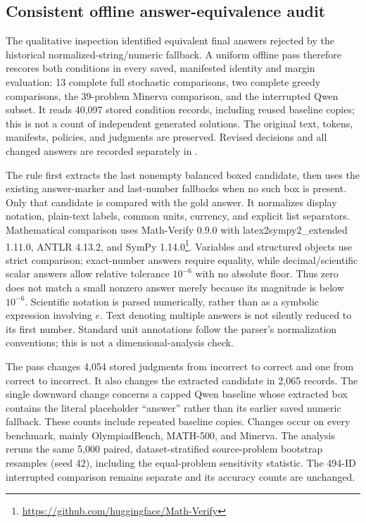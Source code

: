 \subsection{Consistent offline answer-equivalence audit}
\label{sec:guiding-rescoring}

The qualitative inspection identified equivalent final answers rejected by
the historical normalized-string/numeric fallback. A uniform offline pass
therefore rescores both conditions in every saved, manifested identity and
margin evaluation: 13 complete full stochastic comparisons, two complete
greedy comparisons, the 39-problem Minerva comparison, and the interrupted
Qwen subset. It reads 40,097 stored condition records, including reused
baseline copies; this is not a count of independent generated solutions.
The original text, tokens, manifests, policies, and judgments are preserved.
Revised decisions and all changed answers are recorded separately in
.

The rule first extracts the last nonempty balanced boxed candidate, then
uses the existing answer-marker and last-number fallbacks when no such box
is present. Only that candidate is compared with the gold answer. It
normalizes display notation, plain-text labels, common units, currency,
and explicit list separators. Mathematical comparison uses Math-Verify
0.9.0 with latex2sympy2\_extended 1.11.0, ANTLR 4.13.2, and SymPy 1.14.0\footnote{\url{https://github.com/huggingface/Math-Verify}}.
Variables and structured objects use strict comparison; exact-number
answers require equality, while decimal/scientific scalar answers allow
relative tolerance $10^{-6}$ with no absolute floor. Thus zero does not
match a small nonzero answer merely because its magnitude is below
$10^{-6}$. Scientific notation is parsed numerically, rather than as a
symbolic expression involving $e$. Text denoting multiple answers is not
silently reduced to its first number. Standard unit annotations follow the
parser's normalization conventions; this is not a dimensional-analysis check.

The pass changes 4,054 stored judgments from incorrect to correct and one
from correct to incorrect. It also changes the extracted candidate in
2,065 records. The single downward change concerns a capped Qwen baseline
whose extracted box contains the literal placeholder ``answer'' rather
than its earlier saved numeric fallback. These counts include repeated
baseline copies. Changes occur on every benchmark, mainly OlympiadBench,
MATH-500, and Minerva. The analysis reruns the same 5,000 paired,
dataset-stratified source-problem bootstrap resamples (seed 42), including
the equal-problem sensitivity statistic. The 494-ID interrupted comparison
remains separate and its accuracy counts are unchanged.

